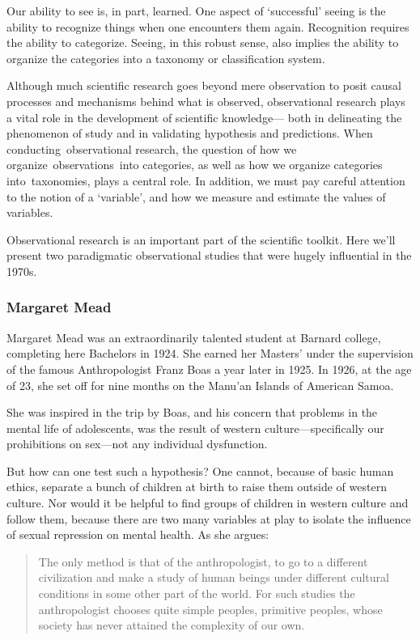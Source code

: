 \begin{refsection}
Our ability to see is, in part, learned. One aspect of `successful' seeing is the ability to recognize things when one encounters them again. Recognition requires the ability to categorize. Seeing, in this robust sense, also implies the ability to organize the categories into a taxonomy or classification system.

Although much scientific research goes beyond mere observation to posit causal processes and mechanisms behind what is observed, observational research plays a vital role in the development of scientific knowledge--- both in delineating the phenomenon of study and in validating hypothesis and predictions. When conducting observational research, the question of how we organize observations into categories, as well as how we organize categories into taxonomies, plays a central role. In addition, we must pay careful attention to the notion of a `variable', and how we measure and estimate the values of variables.

Observational research is an important part of the scientific toolkit. Here we'll present two paradigmatic observational studies that were hugely influential in the 1970s.

\subsubsection{Margaret Mead}
\label{margaretmead}

Margaret Mead was an extraordinarily talented student at Barnard college, completing here Bachelors in 1924. She earned her Masters' under the supervision of the famous Anthropologist Franz Boas a year later in 1925. In 1926, at the age of 23, she set off for nine months on the Manu'an Islands of American Samoa. 

She was inspired in the trip by Boas, and his concern that problems in the mental life of adolescents, was the result of western culture---specifically our prohibitions on sex---not any individual dysfunction. 

But how can one test such a hypothesis? One cannot, because of basic human ethics, separate a bunch of children at birth to raise them outside of western culture. Nor would it be helpful to find groups of children in western culture and follow them, because there are two many variables at play to isolate the influence of sexual repression on mental health. As she argues:

\begin{quote}

The only method is that of the anthropologist, to go to a different civilization and make a study of human beings under different cultural conditions in some other part of the world. For such studies the anthropologist chooses quite simple peoples, primitive peoples, whose society has never attained the complexity of our own. 
\end{quote}


\end{refsection}
